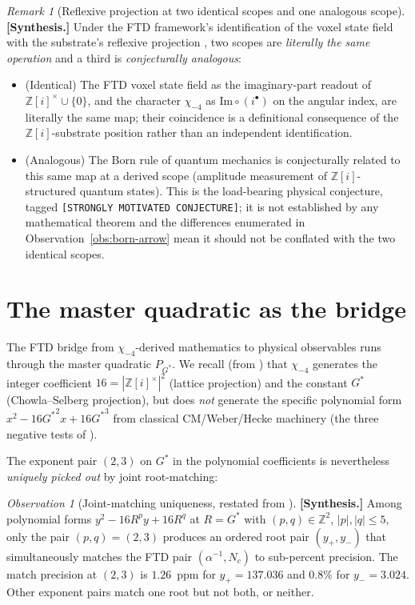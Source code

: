 \documentclass[11pt]{amsart}
\theoremstyle{plain}
\theoremstyle{definition}
\theoremstyle{remark}
\newtheorem*{remark}{Remark}
\newtheorem*{observation}{Observation}
\newcommand{\Gs}{G^{*}}
\newcommand{\Gss}{{G^{*}}^{2}}
\newcommand{\Gsss}{{G^{*}}^{3}}
\newcommand{\Z}{\mathbb{Z}}
\begin{document}
\begin{remark}[Reflexive projection at two identical scopes and one analogous scope]\label{rem:three-scopes}
\textbf{[Synthesis.]} Under the FTD framework's identification of the
voxel state field with the substrate's reflexive projection
\cite{ftd-spec}, two scopes are \emph{literally the same operation} and
a third is \emph{conjecturally analogous}:
\begin{itemize}[leftmargin=*, itemsep=2pt]
\item (Identical) The FTD voxel state field as the imaginary-part readout
of $\Z[i]^{\times} \cup \{0\}$, and the character $\chi_{-4}$ as
$\mathrm{Im} \circ (i^{\bullet})$ on the angular index, are literally
the same map; their coincidence is a definitional consequence of the
$\Z[i]$-substrate position rather than an independent identification.
\item (Analogous) The Born rule of quantum mechanics is conjecturally
related to this same map at a derived scope (amplitude measurement of
$\Z[i]$-structured quantum states). This is the load-bearing physical
conjecture, tagged \texttt{[STRONGLY MOTIVATED CONJECTURE]}; it is not
established by any mathematical theorem and the differences enumerated in
Observation~\ref{obs:born-arrow} mean it should not be conflated with the
two identical scopes.
\end{itemize}
\end{remark}

\section{The master quadratic as the bridge}\label{sec:master-quadratic-bridge}

The FTD bridge from $\chi_{-4}$-derived mathematics to physical observables
runs through the master quadratic $P_{\Gs}$. We recall (from
\cite[Theorem 16.2]{paper-gstar-A}) that $\chi_{-4}$ generates the
integer coefficient $16 = |\Z[i]^\times|^{2}$ (lattice projection) and
the constant $\Gs$ (Chowla--Selberg projection), but does \emph{not}
generate the specific polynomial form $x^{2} - 16\Gss x + 16\Gsss$ from
classical CM/Weber/Hecke machinery (the three negative tests of
\cite[\S 16.5]{paper-gstar-A}).

The exponent pair $(2, 3)$ on $\Gs$ in the polynomial coefficients is
nevertheless \emph{uniquely picked out} by joint root-matching:

\begin{observation}[Joint-matching uniqueness, restated from {\cite[\S 16.6]{paper-gstar-A}}]\label{obs:joint-matching-bridge}
\textbf{[Synthesis.]} Among polynomial forms $y^{2} - 16 R^{p} y + 16 R^{q}$
at $R = \Gs$ with $(p, q) \in \Z^{2}$, $|p|, |q| \leq 5$, only the pair
$(p, q) = (2, 3)$ produces an ordered root pair $(y_{+}, y_{-})$ that
simultaneously matches the FTD pair $(\alpha^{-1}, N_{c})$ to sub-percent
precision. The match precision at $(2, 3)$ is $1.26$~ppm for $y_{+} =
137.036$ and $0.8\%$ for $y_{-} = 3.024$. Other exponent pairs match
one root but not both, or neither.
\end{observation}
\end{document}
